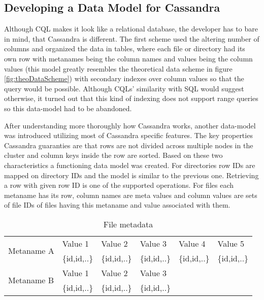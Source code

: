 \subsection{Developing a Data Model for Cassandra}

Although CQL makes it look like a relational database, the developer has to bare in mind, that
Cassandra is different. The first scheme used the altering number of columns and organized the 
data in tables, where each file or directory had its own row with metanames being the column
names and values being the column values (this model greatly resembles the theoretical data 
scheme in figure \ref{fig:theoDataScheme}) with secondary indexes over column values so that 
the query would be possible. Although CQLs' similarity with SQL would suggest otherwise, 
it turned out that this kind of indexing does not support range queries so this data-model
had to be abandoned. 

After understanding more thoroughly how Cassandra works, another data-model was introduced 
utilizing most of Cassandra specific features. The key properties Cassandra guaranties are that 
rows are not divided across multiple nodes in the cluster and column keys inside the row
are sorted. Based on these two characteristics a functioning data model was created. For  
directories row IDs are mapped on directory IDs and the model is similar to the previous one. 
Retrieving a row with given row ID is one of the supported operations.
For files each metaname has its row, column names are meta values and column values are sets of 
file IDs of files having this metaname and value associated with them. 

\begin{table}[h]
\centering
\begin{tabular}{|l|l|l|l|ll}
\hline
\multirow{2}{*}{Metaname A} & Value 1      & Value 2      & Value 3      & \multicolumn{1}{l|}{Value 4}      & \multicolumn{1}{l|}{Value 5}      \\ \cline{2-6}
                            & \{id,id,..\} & \{id,id,..\} & \{id,id,..\} & \multicolumn{1}{l|}{\{id,id,..\}} & \multicolumn{1}{l|}{\{id,id,..\}} \\ \hline
\multirow{2}{*}{Metaname B} & Value 1      & Value 2      & Value 3      &                                   &                                   \\ \cline{2-4}
                            & \{id,id,..\} & \{id,id,..\} & \{id,id,..\} &                                   &                                   \\ \cline{1-4}
\end{tabular}
\caption{File metadata}
\label{tab:fileMeta}
\end{table}

